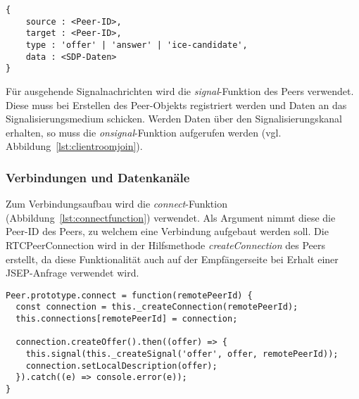 \vspace{5pt}
\lstset{language=js, style=STYLE_CODE_JS}
\begin{singlespace}
\begin{lstlisting}[caption={Format des Signalisierungsprotokolls}, captionpos=b, label={lst:protocoll}]
{
    source : <Peer-ID>,
    target : <Peer-ID>,
    type : 'offer' | 'answer' | 'ice-candidate',
    data : <SDP-Daten>
}
\end{lstlisting}
\end{singlespace}

Für ausgehende Signalnachrichten wird die \textit{signal}-Funktion des Peers verwendet. Diese muss bei Erstellen des Peer-Objekts registriert werden und Daten an das Signalisierungsmedium schicken. Werden Daten über den Signalisierungskanal erhalten, so muss die \textit{onsignal}-Funktion aufgerufen werden (vgl. Abbildung~\ref{lst:clientroomjoin}).

\subsubsection{Verbindungen und Datenkanäle}
Zum Verbindungsaufbau wird die \textit{connect}-Funktion (Abbildung~\ref{lst:connectfunction}) verwendet. Als Argument nimmt diese die Peer-ID des Peers, zu welchem eine Verbindung aufgebaut werden soll. Die RTCPeerConnection wird in der Hilfsmethode \textit{createConnection} des Peers erstellt, da diese Funktionalität auch auf der Empfängerseite bei Erhalt einer \acs{JSEP}-Anfrage verwendet wird.\par

\vspace{5pt}
\lstset{language=js, style=STYLE_CODE_JS}
\begin{minipage}{\textwidth}
\begin{singlespace}
\begin{lstlisting}[caption={\textit{connect}-Funktion -- peer.js}, captionpos=b, label={lst:connectfunction}]
Peer.prototype.connect = function(remotePeerId) {
  const connection = this._createConnection(remotePeerId);
  this.connections[remotePeerId] = connection;

  connection.createOffer().then((offer) => {
    this.signal(this._createSignal('offer', offer, remotePeerId));
    connection.setLocalDescription(offer);
  }).catch((e) => console.error(e));
}
\end{lstlisting}
\end{singlespace}
\end{minipage}


